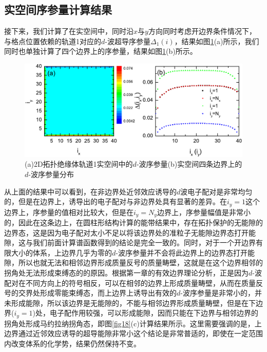 \subsection{实空间序参量计算结果}
接下来，我们计算了在实空间中，同时沿$x$与$y$方向同时考虑开边界条件情况下，与格点位置依赖的轨道1对应的$d$-波超导序参量$\Delta_1(i)$，结果如图\ref{fig20}(a)所示，我们同时也单独计算了四个边界上的序参量，结果如图\ref{fig20}(b)所示。
\begin{figure}[h]
	\centering
	\includegraphics[scale=0.9]{pic/fig21}
	\caption{(a)2D拓扑绝缘体轨道1实空间中的$d$-波序参量(b)实空间四条边界上的$d$-波序参量分布}\label{fig20}
\end{figure}

从上面的结果中可以看到，在非边界处近邻效应诱导的$d$波电子配对是非常均匀的，但是在边界上，诱导出的电子配对与非边界处具有显著的差异。在$i_y=1$这个边界上，序参量的值相对比较大，但是在$i_y=N_y$边界上，序参量幅值是非常小的，因此在这条边上，在圆柱形结构计算的能带结果中，存在拓扑保护的无能隙的边界态，这是因为电子配对太小不足以将该边界处的准粒子无能隙边界态打开能隙，这与我们前面计算谱函数得到的结论是完全一致的。同时，对于一个开边界有限大小的体系，上边界几乎为零的$d$-波序参量并不会将此边界上的边界态打开能隙，所以也就无法和相邻边界形成质量反号的质量畴壁，这就是在这个边界相邻的拐角处无法形成束缚态的的原因。根据第一章的有效边界理论分析，正是因为$d$-波配对在不同方向上的符号相反，可以在相邻的边界上形成质量畴壁，从而在质量反号的交界处形成零能束缚态，而上边界上诱导出有效的$d$-波序参量是非常小的，并未形成能隙，所以该边界是无能隙的，不能与相邻边界形成质量畴壁，但是在下边界($i_y=1$)处，电子配作用较强，可以形成能隙，因而只能在下边界与相邻边界的拐角处形成马约拉纳拐角态，即图\ref{fig18}(c)计算结果所示。这里需要强调的是，上边界通过近邻效应诱导的超导能隙非常小这个结论是非常普适的，即使在一定范围内改变体系的化学势，结果仍然保持不变。
